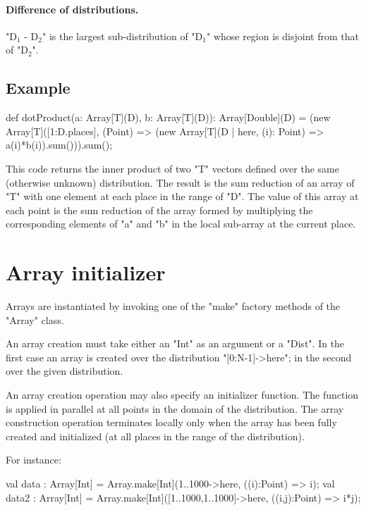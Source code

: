 \paragraph{Difference of distributions.}
\xcdmath"D$_1$ - D$_2$" is the largest sub-distribution of
\xcdmath"D$_1$" whose region is disjoint from that of
\xcdmath"D$_2$".


\subsection{Example}
\begin{xten}
def dotProduct(a: Array[T](D), b: Array[T](D)): Array[Double](D) =
  (new Array[T]([1:D.places],
      (Point) => (new Array[T](D | here,
                    (i): Point) => a(i)*b(i)).sum())).sum();
\end{xten}

This code returns the inner product of two \xcd"T" vectors defined
over the same (otherwise unknown) distribution. The result is the sum
reduction of an array of \xcd"T" with one element at each place in the
range of \xcd"D". The value of this array at each point is the sum
reduction of the array formed by multiplying the corresponding
elements of \xcd"a" and \xcd"b" in the local sub-array at the current
place.




\section{Array initializer}\label{ArrayInitializer}\label{array!creation}

Arrays are instantiated by invoking one of the \xcd"make" factory
methods of the \xcd"Array" class.

An array creation 
must take either an \xcd"Int" as an argument or a \xcd"Dist". In the first
case an array is created over the distribution \xcd"[0:N-1]->here";
in the second over the given distribution. 

An array creation operation may also specify an initializer
function.
The function is applied in parallel
at all points in the domain of the distribution. The array
construction operation terminates locally only when the array has been
fully created and initialized (at all places in the range of the
distribution).

For instance:
\begin{xten}
val data : Array[Int]
    = Array.make[Int](1..1000->here, ((i):Point) => i);
val data2 : Array[Int]
    = Array.make[Int]([1..1000,1..1000]->here, ((i,j):Point) => i*j);
\end{xten}

